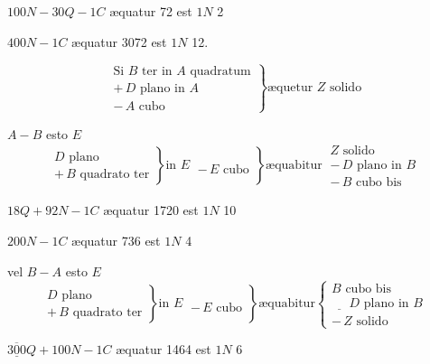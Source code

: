 \documentclass[11pt,a4paper]{article}
\begin{document}
$100N - 30Q - 1C$ æquatur 72 est $1N$ 2

$400N - 1C$ æquatur 3072 est $1N$ 12.

\[ \left. \begin{array}{l} \text{Si } B \text{ ter in } A \text{ quadratum} \\ +\,D \text{ plano in } A \\ -\,A \text{ cubo} \end{array} \right\} \text{æquetur } Z \text{ solido} \]

$A - B$ esto $E$
\[ \left. \left. \begin{array}{l} D \text{ plano} \\ +\,B \text{ quadrato ter} \end{array} \right\} \text{in } E \ \begin{array}{l} \\ -\,E \text{ cubo} \end{array} \right\} \text{æquabitur} \ \begin{array}{l} Z \text{ solido} \\ -\,D \text{ plano in } B \\ -\,B \text{ cubo bis} \end{array} \]

$18Q + 92N - 1C$ æquatur 1720 est $1N$ 10

$200N - 1C$ æquatur 736 est $1N$ 4

vel $B - A$ esto $E$
\[ \left. \left. \begin{array}{l} D \text{ plano} \\ +\,B \text{ quadrato ter} \end{array} \right\} \text{in } E \ \begin{array}{l} \\ -\,E \text{ cubo} \end{array} \right\} \text{æquabitur} \left\{ \begin{array}{l} B \text{ cubo bis} \\ \underline{\phantom{+}}\,D \text{ plano in } B \\ -\,Z \text{ solido} \end{array} \right. \]
\marginal{$+$}

$\underline{\overline{300}}Q + 100N - 1C$ æquatur 1464 est $1N$ 6
\end{document}
